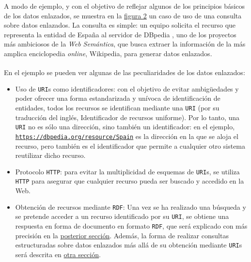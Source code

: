         \noindent A modo de ejemplo, y con el objetivo de reflejar algunos de los principios básicos de los datos enlazados, se muestra en la \hyperref[fig:linked]{figura 2} un caso de uso de una consulta sobre datos enlazados. La consulta es simple: un equipo solicita el recurso que representa la entidad de España al servidor de DBpedia \cite{DBPEDIA}, uno de los proyectos más ambiciosos de la \textit{Web Semántica}, que busca extraer la información de la más amplica enciclopedia \textit{online}, Wikipedia, para generar datos enlazados.
        \\ \\
        En el ejemplo se pueden ver algunas de las peculiaridades de los datos enlazados:
        \begin{itemize}
            \item Uso de \texttt{URI}s como identificadores: con el objetivo de evitar ambigüedades y poder ofrecer una forma estandarizada y unívoca de identificación de entidades, todos los recursos se identifican mediante una \texttt{URI} (por su traducción del inglés, Identificador de recursos uniforme). Por lo tanto, una \texttt{URI} no es sólo una dirección, sino también un identificador: en el ejemplo, \texttt{\url{https://dbpedia.org/resource/Spain}} es la dirección en la que se aloja el recurso, pero también es el identificador que permite a cualquier otro sistema reutilizar dicho recurso.
            \item Protocolo \texttt{HTTP}: para evitar la multiplicidad de esquemas de \texttt{URI}s, se utiliza \texttt{HTTP} para asegurar que cualquier recurso pueda ser buscado y accedido en la Web.
            \item Obtención de recursos mediante \texttt{RDF}: Una vez se ha realizado una búsqueda y se pretende acceder a un recurso identificado por su \texttt{URI}, se obtiene una respuesta en forma de documento en formato \texttt{RDF}, que será explicado con más precisión en la \hyperref[subsubsec:RDF]{posterior sección}. Además, la forma de realizar consultas estructuradas sobre datos enlazados más allá de su obtención mediante \texttt{URI}s será descrita en \hyperref[subsubsec:SPARQL]{otra sección}.
        \end{itemize}
        
